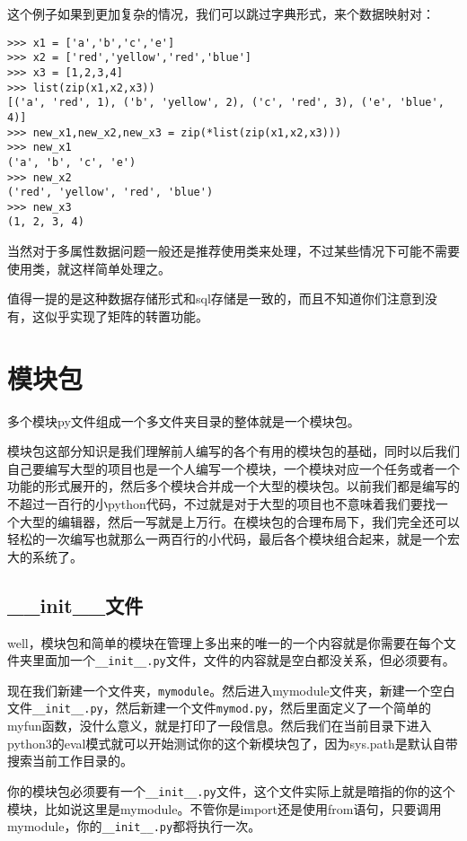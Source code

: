 \documentclass[12pt,oneside]{book}
\begin{document}
\begin{common-format}
这个例子如果到更加复杂的情况，我们可以跳过字典形式，来个数据映射对：
\begin{Verbatim}
>>> x1 = ['a','b','c','e']
>>> x2 = ['red','yellow','red','blue']
>>> x3 = [1,2,3,4]
>>> list(zip(x1,x2,x3))
[('a', 'red', 1), ('b', 'yellow', 2), ('c', 'red', 3), ('e', 'blue', 4)]
>>> new_x1,new_x2,new_x3 = zip(*list(zip(x1,x2,x3)))
>>> new_x1
('a', 'b', 'c', 'e')
>>> new_x2
('red', 'yellow', 'red', 'blue')
>>> new_x3
(1, 2, 3, 4)
\end{Verbatim}

当然对于多属性数据问题一般还是推荐使用类来处理，不过某些情况下可能不需要使用类，就这样简单处理之。

值得一提的是这种数据存储形式和sql存储是一致的，而且不知道你们注意到没有，这似乎实现了矩阵的转置功能。



\chapter{模块包}
多个模块py文件组成一个多文件夹目录的整体就是一个模块包。

模块包这部分知识是我们理解前人编写的各个有用的模块包的基础，同时以后我们自己要编写大型的项目也是一个人编写一个模块，一个模块对应一个任务或者一个功能的形式展开的，然后多个模块合并成一个大型的模块包。以前我们都是编写的不超过一百行的小python代码，不过就是对于大型的项目也不意味着我们要找一个大型的编辑器，然后一写就是上万行。在模块包的合理布局下，我们完全还可以轻松的一次编写也就那么一两百行的小代码，最后各个模块组合起来，就是一个宏大的系统了。

\section{\_{}\_{}init\_{}\_{}文件}
well，模块包和简单的模块在管理上多出来的唯一的一个内容就是你需要在每个文件夹里面加一个\verb+__init__.py+文件，文件的内容就是空白都没关系，但必须要有。

现在我们新建一个文件夹，\verb+mymodule+。然后进入mymodule文件夹，新建一个空白文件\verb+__init__.py+，然后新建一个文件\verb+mymod.py+，然后里面定义了一个简单的myfun函数，没什么意义，就是打印了一段信息。然后我们在当前目录下进入python3的eval模式就可以开始测试你的这个新模块包了，因为sys.path是默认自带搜索当前工作目录的。

你的模块包必须要有一个\verb+__init__.py+文件，这个文件实际上就是暗指的你的这个模块，比如说这里是mymodule。不管你是import还是使用from语句，只要调用mymodule，你的\verb+__init__.py+都将执行一次。


\end{common-format}
\end{document}
